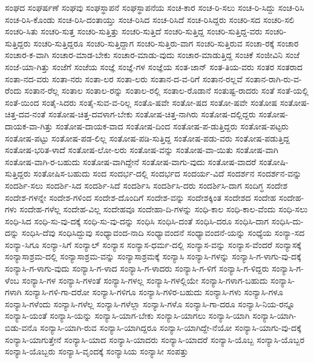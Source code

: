 {ಸಂಘದ
ಸಂಘರ್ಷಣೆ
ಸಂಘವು
ಸಂಘಸ್ಥಾಪನೆ
ಸಂಘಸ್ಥಾಪನೆಯ
ಸಂಚ-ಕಾರ
ಸಂಚ-ರಿ-ಸಲು
ಸಂಚ-ರಿ-ಸಿದ್ದು
ಸಂಚ-ರಿಸಿ
ಸಂಚ-ರಿಸಿ-ಕೊಂಡು
ಸಂಚ-ರಿಸಿ-ದಂತಾಯ್ತು
ಸಂಚ-ರಿಸಿದ
ಸಂಚ-ರಿಸಿದೆ
ಸಂಚ-ರಿಸಿದ್ದರು
ಸಂಚರಿ-ಸದ
ಸಂಚರಿ-ಸಲಿ
ಸಂಚರಿ-ಸಿತು
ಸಂಚರಿ-ಸುತ್ತ
ಸಂಚರಿ-ಸುತ್ತಿತ್ತು
ಸಂಚರಿ-ಸುತ್ತಿದೆ
ಸಂಚರಿ-ಸುತ್ತಿದ್ದ
ಸಂಚರಿ-ಸುತ್ತಿದ್ದ-ವರು
ಸಂಚರಿ-ಸುತ್ತಿದ್ದರು
ಸಂಚರಿ-ಸುತ್ತಿದ್ದರೂ
ಸಂಚರಿ-ಸುತ್ತಿದ್ದಾಗ
ಸಂಚರಿ-ಸುತ್ತಿರು-ವಾಗ
ಸಂಚರಿ-ಸುತ್ತಿರುವ
ಸಂಚಾ-ರಕ್ಕೆ
ಸಂಚಾರ
ಸಂಚಾರ-ಕ-ವಾಗಿ
ಸಂಚಾರ-ಮಾಡ-ಬೇಕು
ಸಂಚಾರ-ಮಾಡು-ವುದು
ಸಂಚಾರ-ಮಾಡುತ್ತಿದ್ದ
ಸಂಚಿಕೆ
ಸಂಜೀವಿನಿ
ಸಂಜೆ
ಸಂಜೆ-ಯಾ-ಗಿತ್ತು
ಸಂಜೆಗೆ
ಸಂಜೆಯ
ಸಂಜ್ಞೆ
ಸಂಜ್ಞೆ-ಗಳ
ಸಂಜ್ಞೆಯ
ಸಂತ-ಜಾನ್
ಸಂತ-ತಿಯ-ವರು
ಸಂತರ
ಸಂತರಾದ
ಸಂತಾ-ನದ-ವರು
ಸಂತಾ-ನರು
ಸಂತಾ-ಲರ
ಸಂತಾ-ಲರು
ಸಂತಾನ-ದ-ವ-ರಿಗೆ
ಸಂತಾನ-ರಲ್ಲವೆ
ಸಂತಾನ-ರಾಗಿ-ರು-ವ-ರೆಂದು
ಸಂತಾನ-ರೆಲ್ಲ
ಸಂತಾಲ
ಸಂತಾಲ-ರನ್ನು
ಸಂತಾಲ-ರಲ್ಲಿ
ಸಂತಾಲ-ರೊಡಾನೆ
ಸಂತುಷ್ಟ-ರಾದರು
ಸಂತೆ
ಸಂತೆ-ಯಲ್ಲಿ
ಸಂತೆ-ಯಿಂದ
ಸಂತೈ-ಸಿದರು
ಸಂತೈ-ಸುವ-ವ-ರಿಲ್ಲ
ಸಂತೊ-ಷವೇ
ಸಂತೋ-ಷದ
ಸಂತೋ-ಷವೇ
ಸಂತೋಷ
ಸಂತೋಷ-ಚಿತ್ತ-ದವ-ನಂತೆ
ಸಂತೋಷ-ಚಿತ್ತ-ದವಳಾಗ-ಬೇಕು
ಸಂತೋಷ-ಚಿತ್ತ-ನಾಗಿರು
ಸಂತೋಷ-ದಲ್ಲಿದ್ದರು
ಸಂತೋಷ-ದಾಯಕ-ವಾ-ಗಿತ್ತು
ಸಂತೋಷ-ದಾಯಕ-ವಾದ
ಸಂತೋಷ-ದಿಂದ
ಸಂತೋಷ-ಪ-ಡುತ್ತಿದ್ದರು
ಸಂತೋಷ-ಪಟ್ಟರು
ಸಂತೋಷ-ಪಟ್ಟು
ಸಂತೋಷ-ಪಡ-ಲಿಲ್ಲ
ಸಂತೋಷ-ಪಡಿ-ಸುತ್ತಿದ್ದ
ಸಂತೋಷ-ಪಡು-ವರು
ಸಂತೋಷ-ಪಡುತ್ತಿದ್ದ
ಸಂತೋಷ-ಭರಿತ-ಳಾದೆ
ಸಂತೋಷ-ಲೋ-ಲರು
ಸಂತೋಷ-ವನ್ನು
ಸಂತೋಷ-ವಾ-ಯಿತು
ಸಂತೋಷ-ವಾಗಿ
ಸಂತೋಷ-ವಾಗಿ-ರ-ಬಹುದು
ಸಂತೋಷ-ವಾಗಿದ್ದೇನೆ
ಸಂತೋಷ-ವಾಗು-ವುದು
ಸಂತೋಷ-ವಾದರೆ
ಸಂತೋಷಿ-ಸುತ್ತಿದ್ದರು
ಸಂತೋಷಿಸ-ಬಹುದು
ಸಂದ
ಸಂದರ್ಭ-ದಲ್ಲಿ
ಸಂದರ್ಭದ
ಸಂದರ್ಯ-ವಿದೆ
ಸಂದರ್ಶನ
ಸಂದರ್ಶನ-ವನ್ನು
ಸಂದರ್ಶಿ-ಸಲು
ಸಂದರ್ಶಿ-ಸಿದ
ಸಂದರ್ಶಿ-ಸಿದೆ
ಸಂದರ್ಶಿಸಿ
ಸಂದರ್ಶಿಸಿ-ದರು
ಸಂದರ್ಶಿಸಿ-ದಾಗ
ಸಂದಿಗ್ಧ
ಸಂದೇಶ
ಸಂದೇಶ-ಗಳನ್ನೇ
ಸಂದೇಶ-ಗಳಿಂದ
ಸಂದೇಶ-ದೊಂದಿಗೆ
ಸಂದೇಶ-ವನ್ನು
ಸಂದೇಶಕ್ಕಿಂತ
ಸಂದೇಶದ
ಸಂದೇಹ
ಸಂದೇಹ-ಗಳು
ಸಂದೇಹ-ಗಳೆಲ್ಲ
ಸಂದೇಹ-ವಿಲ್ಲ
ಸಂದೇಹವೂ
ಸಂದೇಹಾ-ದಿ-ಗಳನ್ನು
ಸಂಧಿ-ಕಾಲ
ಸಂಧಿ-ಕಾಲ-ವೆಂದು
ಸಂಧಿ-ಸಲು
ಸಂಧಿ-ಸಿದ
ಸಂಧಿ-ಸು-ವು-ದಕ್ಕೆ
ಸಂಧಿ-ಸು-ವು-ದನ್ನು
ಸಂಧಿಸಿ
ಸಂಧಿಸಿ-ದಂತೆ
ಸಂಧಿಸಿ-ದರೂ
ಸಂಧಿಸಿ-ದಾಗ
ಸಂಧಿಸಿ-ದು-ದನ್ನು
ಸಂಧಿಸಿ-ದೆವು
ಸಂಧಿಸಿದ್ದುವು
ಸಂಧ್ಯಾವಂದ-ನಾದಿ
ಸಂಧ್ಯಾವಂದನೆ
ಸಂಧ್ಯಾವಂದನೆ-ಯನ್ನು
ಸಂಧ್ಯೆಯ
ಸಂನ್ಯಾ-ಸದ
ಸಂನ್ಯಾ-ಸಿಗೂ
ಸಂನ್ಯಾ-ಸಿಗೆ
ಸಂನ್ಯಾಲ್
ಸಂನ್ಯಾಸ
ಸಂನ್ಯಾಸ-ಧರ್ಮ-ದಲ್ಲಿ
ಸಂನ್ಯಾಸ-ವನ್ನು
ಸಂನ್ಯಾಸ-ವೆಂದರೆ
ಸಂನ್ಯಾಸಕ್ಕೆ
ಸಂನ್ಯಾಸಾಶ್ರಮ-ದಲ್ಲಿ
ಸಂನ್ಯಾಸಾಶ್ರಮ-ವನ್ನು
ಸಂನ್ಯಾಸಾಶ್ರಮಕ್ಕೆ
ಸಂನ್ಯಾಸಿ
ಸಂನ್ಯಾಸಿ-ಗಳನ್ನು
ಸಂನ್ಯಾಸಿ-ಗ-ಳಾಗು-ವು-ದಕ್ಕೆ
ಸಂನ್ಯಾಸಿ-ಗ-ಳಾಗು-ವುದು
ಸಂನ್ಯಾಸಿ-ಗ-ಳಾದ
ಸಂನ್ಯಾಸಿ-ಗ-ಳಾದರು
ಸಂನ್ಯಾಸಿ-ಗ-ಳಿಗೆ
ಸಂನ್ಯಾಸಿ-ಗ-ಳಿದ್ದರು
ಸಂನ್ಯಾಸಿ-ಗ-ಳೆಂಬ
ಸಂನ್ಯಾಸಿ-ಗಳ
ಸಂನ್ಯಾಸಿ-ಗಳಂತೆ
ಸಂನ್ಯಾಸಿ-ಗಳಲ್ಲ
ಸಂನ್ಯಾಸಿ-ಗಳಲ್ಲಿಯೇ
ಸಂನ್ಯಾಸಿ-ಗಳಾಗ-ಬಹುದು
ಸಂನ್ಯಾಸಿ-ಗಳಾಗಿ
ಸಂನ್ಯಾಸಿ-ಗಳಿ-ಗಾ-ದರೋ
ಸಂನ್ಯಾಸಿ-ಗಳಿಗೂ
ಸಂನ್ಯಾಸಿ-ಗಳಿರ-ಬಹುದು
ಸಂನ್ಯಾಸಿ-ಗಳು
ಸಂನ್ಯಾಸಿ-ಗಳೂ
ಸಂನ್ಯಾಸಿ-ಗಳೆಂದು
ಸಂನ್ಯಾಸಿ-ಗಳೆಲ್ಲ
ಸಂನ್ಯಾಸಿ-ಗಳೆಲ್ಲಾ
ಸಂನ್ಯಾಸಿ-ಗಳೊ
ಸಂನ್ಯಾಸಿ-ಗಾ-ದರೂ
ಸಂನ್ಯಾಸಿ-ನಿಯ-ರನ್ನೂ
ಸಂನ್ಯಾಸಿ-ಯಂತೆ
ಸಂನ್ಯಾಸಿ-ಯನ್ನು
ಸಂನ್ಯಾಸಿ-ಯಾಗ-ಬೇಕು
ಸಂನ್ಯಾಸಿ-ಯಾಗಲು
ಸಂನ್ಯಾಸಿ-ಯಾಗಿ
ಸಂನ್ಯಾಸಿ-ಯಾಗಿ-ಬಿಡು-ವನೊ
ಸಂನ್ಯಾಸಿ-ಯಾಗಿ-ರುವ
ಸಂನ್ಯಾಸಿ-ಯಾಗಿದ್ದರೂ
ಸಂನ್ಯಾಸಿ-ಯಾಗಿದ್ದೇ-ನೆಯೋ
ಸಂನ್ಯಾಸಿ-ಯಾಗು-ವು-ದಕ್ಕೆ
ಸಂನ್ಯಾಸಿ-ಯಾಗುತ್ತೇನೆ
ಸಂನ್ಯಾಸಿ-ಯಾದ
ಸಂನ್ಯಾಸಿ-ಯಾದರು
ಸಂನ್ಯಾಸಿ-ಯಾದರೆ
ಸಂನ್ಯಾಸಿ-ಯೊಬ್ಬ
ಸಂನ್ಯಾಸಿ-ಯೊಬ್ಬರ
ಸಂನ್ಯಾಸಿ-ಯೊಬ್ಬರು
ಸಂನ್ಯಾಸಿ-ವೃಂದಕ್ಕೆ
ಸಂನ್ಯಾಸಿಯ
ಸಂನ್ಯಾಸೀ
ಸಂಪತ್ತು
}
